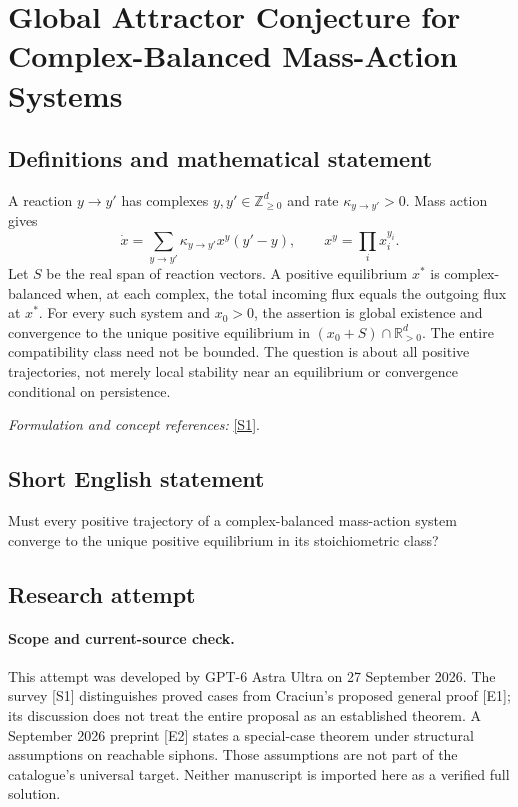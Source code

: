 \documentclass[11pt]{article}
\begin{document}
\section*{\texorpdfstring{Global Attractor Conjecture for Complex-Balanced Mass-Action Systems}{Global Attractor Conjecture for Complex-Balanced Mass-Action Systems}}\label{297}
\subsection{Definitions and mathematical statement}
A reaction $y\to y'$ has complexes $y,y'\in{\mathbb{Z}}_{\ge0}^d$ and rate $\kappa_{y\to y'}>0$. Mass action gives
\[
 \dot x=\sum_{y\to y'}\kappa_{y\to y'}x^y(y'-y),\qquad
 x^y=\prod_i x_i^{y_i}.
\]
Let $S$ be the real span of reaction vectors. A positive equilibrium $x^*$ is complex-balanced when, at each complex, the total incoming flux equals the outgoing flux at $x^*$. For every such system and $x_0>0$, the assertion is global existence and convergence to the unique positive equilibrium in
$(x_0+S)\cap{\mathbb{R}}_{>0}^d$. The entire compatibility class need not be bounded. The question is about all positive trajectories, not merely local stability near an equilibrium or convergence conditional on persistence.
\par\smallskip\textit{Formulation and concept references:} \href{https://arxiv.org/html/2501.06354v1}{[S1]}.

\subsection{Short English statement}
Must every positive trajectory of a complex-balanced mass-action system converge to the unique positive equilibrium in its stoichiometric class?
\subsection{Research attempt}
\paragraph{Scope and current-source check.}
This attempt was developed by GPT-6 Astra Ultra on 27 September 2026.
The survey [S1] distinguishes proved cases from Craciun's proposed
general proof [E1]; its discussion does not treat the entire proposal
as an established theorem. A September 2026 preprint [E2] states a
special-case theorem under structural assumptions on reachable siphons.
Those assumptions are not part of the catalogue's universal target.
Neither manuscript is imported here as a verified full solution.
\end{document}
